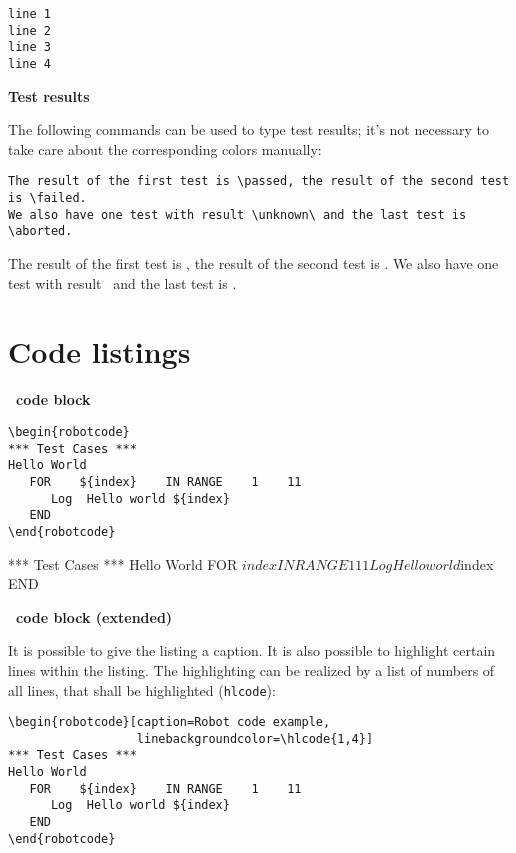 \documentclass[a4paper,10pt]{report}
\begin{document}
\texttt{line 1}\\
\tab \texttt{line 2}\\
\tab \texttt{line 3}\\
\tab \texttt{line 4}\\

\vspace{2ex}

\textbf{Test results}

The following commands can be used to type test results; it's not necessary to take care about the corresponding colors manually:

\begin{verbatim}
The result of the first test is \passed, the result of the second test is \failed.
We also have one test with result \unknown\ and the last test is \aborted.
\end{verbatim}

The result of the first test is \passed, the result of the second test is \failed.
We also have one test with result \unknown\ and the last test is \aborted.

\newpage

\section{Code listings}

\textbf{\rfw\ code block}
\begin{verbatim}
\begin{robotcode}
*** Test Cases ***
Hello World
   FOR    ${index}    IN RANGE    1    11
      Log  Hello world ${index}
   END
\end{robotcode}
\end{verbatim}

\begin{robotcode}
*** Test Cases ***
Hello World
   FOR    ${index}    IN RANGE    1    11
      Log  Hello world ${index}
   END
\end{robotcode}

\vspace{2ex}

\textbf{\rfw\ code block (extended)}

It is possible to give the listing a caption. It is also possible to highlight certain lines within the listing. The highlighting can be realized by a list
of numbers of all lines, that shall be highlighted (\texttt{hlcode}):

\begin{verbatim}
\begin{robotcode}[caption=Robot code example, 
                  linebackgroundcolor=\hlcode{1,4}]
*** Test Cases ***
Hello World
   FOR    ${index}    IN RANGE    1    11
      Log  Hello world ${index}
   END
\end{robotcode}
\end{verbatim}
\end{document}
